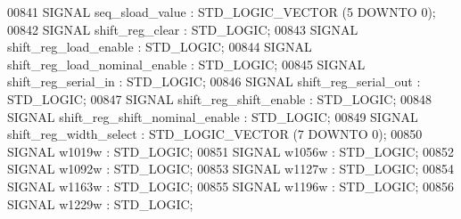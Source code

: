 \begin{DoxyCode}
{00841      \textcolor{keywordflow}{SIGNAL}  \textcolor{vhdlchar}{seq_sload_value} \textcolor{vhdlchar}{:}  \textcolor{comment}{STD\_LOGIC\_VECTOR} \textcolor{vhdlchar}{(}\textcolor{vhdllogic}{}\textcolor{vhdllogic}{5} \textcolor{keywordflow}{DOWNTO} \textcolor{vhdllogic}{}\textcolor{vhdllogic}{0}\textcolor{vhdlchar}{)};
00842      \textcolor{keywordflow}{SIGNAL}  \textcolor{vhdlchar}{shift_reg_clear} \textcolor{vhdlchar}{:}  \textcolor{comment}{STD\_LOGIC};
00843      \textcolor{keywordflow}{SIGNAL}  \textcolor{vhdlchar}{shift_reg_load_enable} \textcolor{vhdlchar}{:}    \textcolor{comment}{STD\_LOGIC};
00844      \textcolor{keywordflow}{SIGNAL}  \textcolor{vhdlchar}{shift_reg_load_nominal_enable} \textcolor{vhdlchar}{:}    \textcolor{comment}{STD\_LOGIC};
00845      \textcolor{keywordflow}{SIGNAL}  \textcolor{vhdlchar}{shift_reg_serial_in} \textcolor{vhdlchar}{:}  \textcolor{comment}{STD\_LOGIC};
00846      \textcolor{keywordflow}{SIGNAL}  \textcolor{vhdlchar}{shift_reg_serial_out} \textcolor{vhdlchar}{:} \textcolor{comment}{STD\_LOGIC};
00847      \textcolor{keywordflow}{SIGNAL}  \textcolor{vhdlchar}{shift_reg_shift_enable} \textcolor{vhdlchar}{:}   \textcolor{comment}{STD\_LOGIC};
00848      \textcolor{keywordflow}{SIGNAL}  \textcolor{vhdlchar}{shift_reg_shift_nominal_enable} \textcolor{vhdlchar}{:}   \textcolor{comment}{STD\_LOGIC};
00849      \textcolor{keywordflow}{SIGNAL}  \textcolor{vhdlchar}{shift_reg_width_select} \textcolor{vhdlchar}{:}   \textcolor{comment}{STD\_LOGIC\_VECTOR} \textcolor{vhdlchar}{(}\textcolor{vhdllogic}{}\textcolor{vhdllogic}{7} \textcolor{keywordflow}{DOWNTO} \textcolor{vhdllogic}{}\textcolor{vhdllogic}{0}\textcolor{vhdlchar}{)};
00850      \textcolor{keywordflow}{SIGNAL}  \textcolor{vhdlchar}{w1019w} \textcolor{vhdlchar}{:}   \textcolor{comment}{STD\_LOGIC};
00851      \textcolor{keywordflow}{SIGNAL}  \textcolor{vhdlchar}{w1056w} \textcolor{vhdlchar}{:}   \textcolor{comment}{STD\_LOGIC};
00852      \textcolor{keywordflow}{SIGNAL}  \textcolor{vhdlchar}{w1092w} \textcolor{vhdlchar}{:}   \textcolor{comment}{STD\_LOGIC};
00853      \textcolor{keywordflow}{SIGNAL}  \textcolor{vhdlchar}{w1127w} \textcolor{vhdlchar}{:}   \textcolor{comment}{STD\_LOGIC};
00854      \textcolor{keywordflow}{SIGNAL}  \textcolor{vhdlchar}{w1163w} \textcolor{vhdlchar}{:}   \textcolor{comment}{STD\_LOGIC};
00855      \textcolor{keywordflow}{SIGNAL}  \textcolor{vhdlchar}{w1196w} \textcolor{vhdlchar}{:}   \textcolor{comment}{STD\_LOGIC};
00856      \textcolor{keywordflow}{SIGNAL}  \textcolor{vhdlchar}{w1229w} \textcolor{vhdlchar}{:}   \textcolor{comment}{STD\_LOGIC};
}
\end{DoxyCode}
